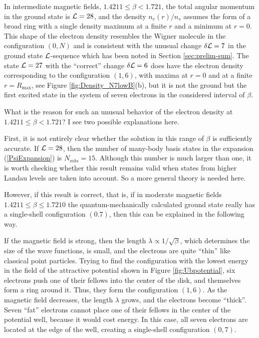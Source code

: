 \documentclass[aps,prb,10pt%
]{revtex4-2}
\begin{document}
In intermediate magnetic fields, $1.4211\le \beta< 1.721$, the total angular momentum in the ground state is ${\cal L}=28$, and the density $n_e(r)/n_s$ assumes the form of a broad ring with a single density maximum at a finite $r$ and a minimum at $r=0$. This shape of the electron density resembles the Wigner molecule in the configuration $(0,N)$ and is consistent with the unusual change $\delta{\cal L}=7$ in the ground state ${\cal L}$-sequence which has been noted in Section \ref{sec:prelim-sum}. The state ${\cal L}=27$ with the ``correct'' change $\delta{\cal L}=6$ does have the electron density corresponding to the configuration $(1,6)$, with maxima at $r=0$ and at a finite $r=R_{\max}$, see Figure \ref{fig:Density_N7lowB}(b), but it is not the ground but the first excited state in the system of seven electrons in the considered interval of $\beta$.

What is the reason for such an unusual behavior of the electron density at $1.4211\le \beta< 1.721$? I see two possible explanations here.

First, it is not entirely clear whether the solution in this range of $\beta$ is sufficiently accurate. If ${\cal L}=28$, then the number of many-body basis states in the expansion (\ref{PsiExpansion}) is $N_{mbs}=15$. Although this number is much larger than one, it is worth checking whether this result remains valid when states from higher Landau levels are taken into account. So a more general theory is needed here.

However, if this result is correct, that is, if in moderate magnetic fields $1.4211\le\beta\le 1.7210$ the quantum-mechanically calculated ground state really has a single-shell configuration $(0.7)$, then this can be explained in the following way. 

If the magnetic field is strong, then the length $\lambda\propto 1/\sqrt{\beta}$, which determines the size of the wave functions, is small, and the electrons are quite ``thin'' like classical point particles. Trying to find the configuration with the lowest energy in the field of the attractive potential shown in Figure \ref{fig:Ubpotential}, six electrons push one of their fellows into the center of the disk, and themselves form a ring around it. Thus, they form the configuration $(1,6)$. As the magnetic field decreases, the length $\lambda$ grows, and the electrons become ``thick''. Seven ``fat'' electrons cannot place one of their fellows in the center of the potential well, because it would cost energy. In this case, all seven electrons are located at the edge of the well, creating a single-shell configuration $(0,7)$.
\end{document}
